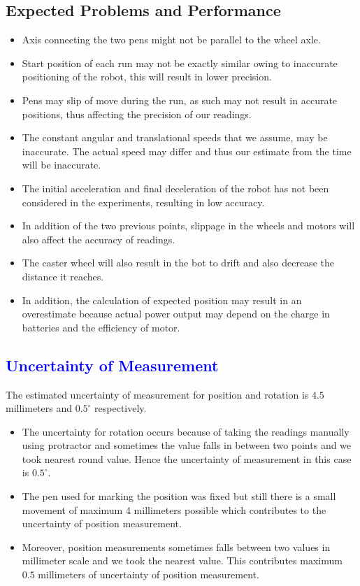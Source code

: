 \documentclass[10pt,a4paper]{article}
\begin{document}
				\subsection{Expected Problems and Performance}
					\begin{itemize}
						\item Axis connecting the two pens might not be parallel to the wheel axle.
						\item Start position of each run may not be exactly similar owing to inaccurate positioning of the robot, this will result in lower precision.
						\item Pens may slip of move during the run, as such may not result in accurate positions, thus affecting the precision of our readings.
						\item The constant angular and translational speeds that we assume, may be inaccurate. The actual speed may differ and thus our estimate from the time will be inaccurate.
						\item The initial acceleration and final deceleration of the robot has not been considered in the experiments, resulting in low accuracy.
						\item In addition of the two previous points, slippage in the wheels and motors will also affect the accuracy of readings.
						\item The caster wheel will also result in the bot to drift and also decrease the distance it reaches.
						\item In addition, the calculation of expected position may result in an overestimate because actual power output may depend on the charge in batteries and the efficiency of motor.
					\end{itemize}
				\subsection{\textcolor{blue}{Uncertainty of Measurement}}
				The estimated uncertainty of measurement for position and rotation is $4.5$ millimeters and $0.5^{\circ}$ respectively.  
				\begin{itemize}
					\item The uncertainty for rotation occurs because of taking the readings manually using protractor and sometimes the value falls in between two points and we took nearest round value. Hence the uncertainty of measurement in this case is $0.5^{\circ}$.
					
					\item  The pen used for marking the position was fixed but still there is a small movement of maximum 4 millimeters possible which contributes to the uncertainty of position measurement.
					
					\item Moreover, position measurements sometimes falls between two values in millimeter scale and we took the nearest value. This contributes maximum $0.5$ millimeters of uncertainty of position measurement.
				\end{itemize}
\end{document}
